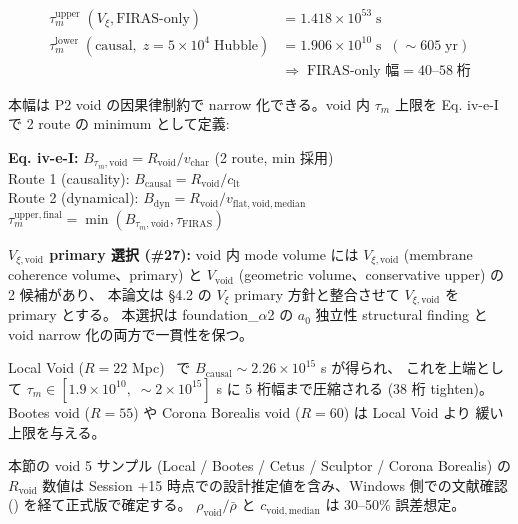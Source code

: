 \documentclass[11pt,a4paper]{ltjsarticle}
\newcommand{\Vxi}{V_{\xi}}
\newcommand{\Vxivoid}{V_{\xi,\mathrm{void}}}
\newcommand{\taum}{\tau_{m}}
\newcommand{\clt}{c_{\mathrm{lt}}}       %
\newcommand{\Rvoid}{R_{\mathrm{void}}}
\newcommand{\vchar}{v_{\mathrm{char}}}
\begin{document}
\begin{align*}
\taum^{\mathrm{upper}}\;(\Vxi, \mathrm{FIRAS\text{-}only}) &= 1.418 \times 10^{53}\;\mathrm{s} \\
\taum^{\mathrm{lower}}\;(\mathrm{causal},\;z = 5 \times 10^{4}\;\mathrm{Hubble}) &= 1.906 \times 10^{10}\;\mathrm{s}\;\;(\sim 605\;\mathrm{yr}) \\
&\Rightarrow\;\text{FIRAS-only 幅} = 40\text{--}58\;\text{桁}
\end{align*}

本幅は P2 void の因果律制約で narrow 化できる。void 内 $\taum$ 上限を Eq. iv-e-I で 2 route の minimum として定義:

\begin{keybox}
\textbf{Eq. iv-e-I:} $B_{\taum,\mathrm{void}} = \Rvoid / \vchar$ (2 route, min 採用)\\[2pt]
\quad Route 1 (causality): $B_{\mathrm{causal}} = \Rvoid / \clt$\\
\quad Route 2 (dynamical): $B_{\mathrm{dyn}} = \Rvoid / v_{\mathrm{flat,void,median}}$\\[2pt]
\quad $\taum^{\mathrm{upper,final}} = \min(B_{\taum,\mathrm{void}}, \tau_{\mathrm{FIRAS}})$
\end{keybox}

\begin{notebox}
\textbf{$\Vxivoid$ primary 選択 (\#27):}
void 内 mode volume には $\Vxivoid$ (membrane coherence volume、primary) と
$V_{\mathrm{void}}$ (geometric volume、conservative upper) の 2 候補があり、
本論文は \S 4.2 の $\Vxi$ primary 方針と整合させて $\Vxivoid$ を primary とする。
本選択は foundation\_$\alpha$2 の $a_0$ 独立性 structural finding と void narrow 化の両方で一貫性を保つ。
\end{notebox}

Local Void ($R = 22$ Mpc)~\citep{Kreckel2011} で $B_{\mathrm{causal}} \sim 2.26 \times 10^{15}$ s が得られ、
これを上端として $\taum \in [1.9 \times 10^{10},\; \sim 2 \times 10^{15}]$ s に 5 桁幅まで圧縮される
(38 桁 tighten)。Bootes void ($R = 55$) や Corona Borealis void ($R = 60$) は Local Void より
緩い上限を与える。

\begin{warnbox}
本節の void 5 サンプル (Local / Bootes / Cetus / Sculptor / Corona Borealis) の $\Rvoid$ 数値は
Session +15 時点での設計推定値を含み、Windows 側での文献確認
(\citealt{Kreckel2011, Pan2012, Ricciardelli2014}) を経て正式版で確定する。
$\rho_{\mathrm{void}}/\bar{\rho}$ と $c_{\mathrm{void,median}}$ は 30--50\% 誤差想定。
\end{warnbox}
\end{document}
